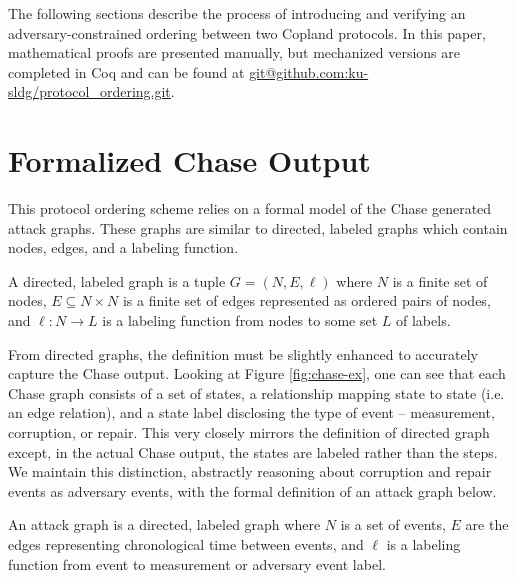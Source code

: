\documentclass[runningheads]{llncs}
\theoremstyle{definition}
\begin{document}
The following sections describe the process of introducing and verifying an adversary-constrained ordering between two Copland protocols. In this paper, mathematical proofs are presented manually, but mechanized versions are completed in Coq and can be found at \url{git@github.com:ku-sldg/protocol_ordering.git}.


\section{Formalized Chase Output}

This protocol ordering scheme relies on a formal model of the Chase generated attack graphs. These graphs are similar to directed, labeled graphs which contain nodes, edges, and a labeling function. 

\begin{definition}[Graph]
    A directed, labeled graph is a tuple $G = (N, E, \ell)$ where $N$ is a finite set of nodes, $E \subseteq N \times N$ is a finite set of edges represented as ordered pairs of nodes, and $\ell : N \rightarrow L$ is a labeling function from nodes to some set $L$ of labels. 
\end{definition}

From directed graphs, the definition must be slightly enhanced to accurately capture the Chase output. Looking at Figure \ref{fig:chase-ex}, one can see that each Chase graph consists of a set of states, a relationship mapping state to state (i.e. an edge relation), and a state label disclosing the type of event -- measurement, corruption, or repair. This very closely mirrors the definition of directed graph except, in the actual Chase output, the states are labeled rather than the steps. We maintain this distinction, abstractly reasoning about corruption and repair events as adversary events, with the formal definition of an attack graph below. 

\begin{definition}
    An attack graph is a directed, labeled graph where $N$ is a set of events, $E$ are the edges representing chronological time between events, and $\ell$ is a labeling function from event to measurement or adversary event label.
\end{definition}

\end{document}
